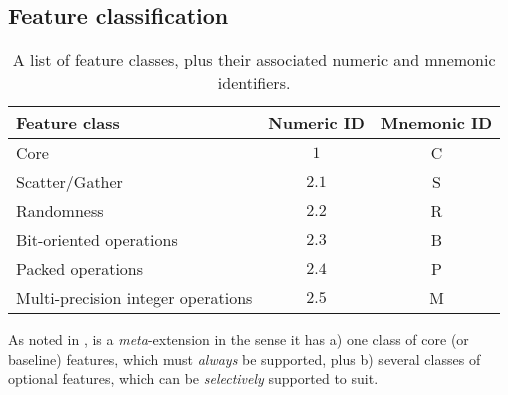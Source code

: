 
\subsection{Feature classification}
\label{sec:bg:feature}

\begin{table}[t]
\begin{center}
\begin{tabular}{|l|cc|}
\hline
Feature class                      & Numeric ID & Mnemonic ID \\
\hline
Core                               & $1$        & C           \\
Scatter/Gather                     & $2.1$      & S           \\
Randomness                         & $2.2$      & R           \\
Bit-oriented            operations & $2.3$      & B           \\
Packed                  operations & $2.4$      & P           \\
Multi-precision integer operations & $2.5$      & M           \\
\hline
\end{tabular}
\end{center}
\caption{A list of feature classes, plus their associated numeric and mnemonic identifiers.}
\label{tab:feature}
\end{table}

As noted in , \XCID is a {\em meta}-extension in the
sense it has 
a) one     class of   core     (or baseline) features,
   which must {\em always} be supported,
   plus
b) several classes of optional               features,
   which can be {\em selectively} supported to suit.



